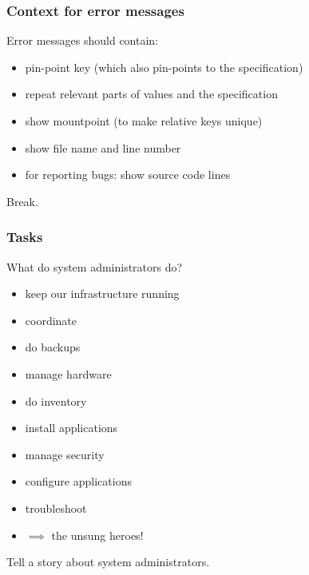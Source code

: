 \begin{frame}
	\frametitle{Context for error messages}

	Error messages should contain:

	\pause

	\begin{itemize} %
	\item pin-point key (which also pin-points to the specification)
	\item repeat relevant parts of values and the specification
	\item show mountpoint (to make relative keys unique)
	\item show file name and line number
	\item for reporting bugs: show source code lines
	\end{itemize}
\end{frame}

\begin{assignment}
	\begin{task}
	Break.
	\end{task}
\end{assignment}

\begin{frame}
	\frametitle{Tasks}

	What do system administrators do?

	\pause

	\begin{itemize} %
	\item keep our infrastructure running
	\item coordinate
	\item do backups
	\item manage hardware
	\item do inventory
	\item install applications
	\item manage security
	\item configure applications
	\item troubleshoot
	\item $\implies$ the unsung heroes!
	\end{itemize}
\end{frame}

\begin{assignment}
	\begin{task}
	Tell a story about system administrators.
	\end{task}
\end{assignment}

